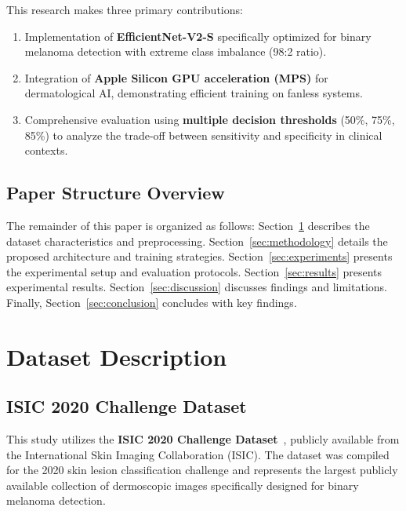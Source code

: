 \documentclass[12pt,a4paper]{article}
\begin{document}
This research makes three primary contributions:

\begin{enumerate}
    \item Implementation of \textbf{EfficientNet-V2-S} specifically optimized for binary melanoma detection with extreme class imbalance (98:2 ratio).
    
    \item Integration of \textbf{Apple Silicon GPU acceleration (MPS)} for dermatological AI, demonstrating efficient training on fanless systems.
    
    \item Comprehensive evaluation using \textbf{multiple decision thresholds} (50\%, 75\%, 85\%) to analyze the trade-off between sensitivity and specificity in clinical contexts.
\end{enumerate}

\subsection{Paper Structure Overview}

The remainder of this paper is organized as follows: Section~\ref{sec:dataset} describes the dataset characteristics and preprocessing. Section~\ref{sec:methodology} details the proposed architecture and training strategies. Section~\ref{sec:experiments} presents the experimental setup and evaluation protocols. Section~\ref{sec:results} presents experimental results. Section~\ref{sec:discussion} discusses findings and limitations. Finally, Section~\ref{sec:conclusion} concludes with key findings.

\section{Dataset Description}
\label{sec:dataset}

\subsection{ISIC 2020 Challenge Dataset}

This study utilizes the \textbf{ISIC 2020 Challenge Dataset}~\cite{rotemberg2021}, publicly available from the International Skin Imaging Collaboration (ISIC). The dataset was compiled for the 2020 skin lesion classification challenge and represents the largest publicly available collection of dermoscopic images specifically designed for binary melanoma detection.
\end{document}
